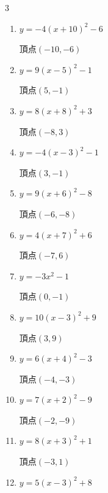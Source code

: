 \begin{multicols}{3}
\begin{enumerate}
        $\displaystyle 頂点\left( 4 , 5 \right)$

  \item $\displaystyle y=-4\left( x+10\right)^{2}-6$

        $\displaystyle 頂点\left( -10 , -6 \right)$

  \item $\displaystyle y=9\left( x-5\right)^{2}-1$

        $\displaystyle 頂点\left( 5 , -1 \right)$

  \item $\displaystyle y=8\left( x+8\right)^{2}+3$

        $\displaystyle 頂点\left( -8 , 3 \right)$

  \item $\displaystyle y=-4\left( x-3\right)^{2}-1$

        $\displaystyle 頂点\left( 3 , -1 \right)$

  \item $\displaystyle y=9\left( x+6\right)^{2}-8$

        $\displaystyle 頂点\left( -6 , -8 \right)$

  \item $\displaystyle y=4\left( x+7\right)^{2}+6$

        $\displaystyle 頂点\left( -7 , 6 \right)$

\columnbreak %

  \item $\displaystyle y=-3x^{2}-1$

        $\displaystyle 頂点\left( 0 , -1 \right)$

  \item $\displaystyle y=10\left( x-3\right)^{2}+9$

        $\displaystyle 頂点\left( 3 , 9 \right)$

  \item $\displaystyle y=6\left( x+4\right)^{2}-3$

        $\displaystyle 頂点\left( -4 , -3 \right)$

  \item $\displaystyle y=7\left( x+2\right)^{2}-9$

        $\displaystyle 頂点\left( -2 , -9 \right)$

  \item $\displaystyle y=8\left( x+3\right)^{2}+1$

        $\displaystyle 頂点\left( -3 , 1 \right)$

  \item $\displaystyle y=5\left( x-3\right)^{2}+8$


\end{enumerate}
\end{multicols}
